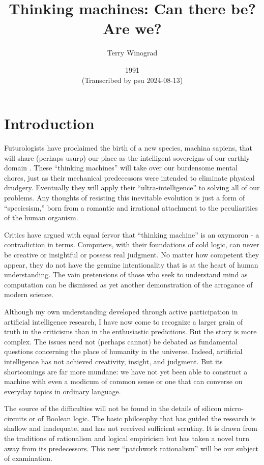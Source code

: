 \documentclass[12pt]{article}
\begin{document}
\title{\Large Thinking machines: Can there be? Are we?}
\author{\large Terry Winograd}
\date{\normalsize 1991 \\ {\footnotesize (Transcribed by psu 2024-08-13)}}

\maketitle

\section{Introduction}

Futurologists have proclaimed the birth of a new species, machina sapiens, that will share (perhaps usurp) our place as the intelligent sovereigns of our earthly domain . These ``thinking machines'' will take over our burdensome mental chores, just as their mechanical predecessors were intended to eliminate physical drudgery. Eventually they will apply their ``ultra-intelligence'' to solving all of our problems. Any thoughts of resisting this inevitable evolution is just a form of ``speciesism,'' born from a romantic and irrational attachment to the peculiarities of the human organism.

Critics have argued with equal fervor that ``thinking machine'' is an oxymoron - a contradiction in terms. Computers, with their foundations of cold logic, can never be creative or insightful or possess real judgment. No matter how competent they appear, they do not have the genuine intentionality that is at the heart of human understanding. The vain pretensions of those who seek to understand mind as computation can be dismissed as yet another demonstration of the arrogance of modern science.

Although my own understanding developed through active participation in artificial intelligence research, I have now come to recognize a larger grain of truth in the criticisms than in the enthusiastic predictions. But the story is more complex. The issues need not (perhaps cannot) be debated as fundamental questions concerning the place of humanity in the universe. Indeed, artificial intelligence has not achieved creativity, insight, and judgment. But its shortcomings are far more mundane: we have not yet been able to construct a machine with even a modicum of common sense or one that can converse on everyday topics in ordinary language.

The source of the difficulties will not be found in the details of silicon micro-circuits or of Boolean logic. The basic philosophy that has guided the research is shallow and inadequate, and has not received sufficient scrutiny. It is drawn from the traditions of rationalism and logical empiricism but has taken a novel turn away from its predecessors. This new ``patchwork rationalism'' will be our subject of examination.
\end{document}
